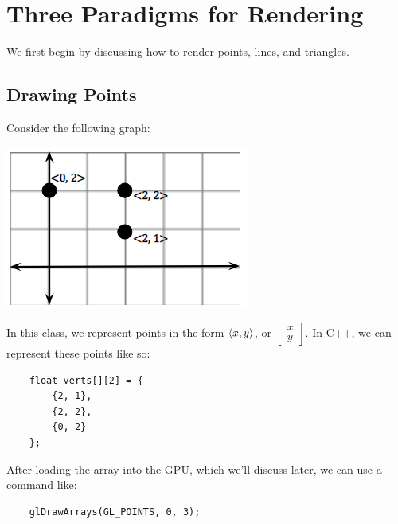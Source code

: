 \documentclass[letterpaper]{article}
\begin{document}
\section{Three Paradigms for Rendering}
We first begin by discussing how to render points, lines, and triangles. 

\subsection{Drawing Points}
Consider the following graph:
\begin{center}
    \includegraphics[scale=1]{../assets/points1.png}
\end{center}
In this class, we represent points in the form $\langle x, y \rangle$, or $\begin{bmatrix}
    x \\ y
\end{bmatrix}$. In C++, we can represent these points like so: 
\begin{verbatim}
    float verts[][2] = {
        {2, 1},
        {2, 2},
        {0, 2}
    };\end{verbatim}
After loading the array into the GPU, which we'll discuss later, we can use a command like: 
\begin{verbatim}
    glDrawArrays(GL_POINTS, 0, 3);\end{verbatim}
\end{document}

